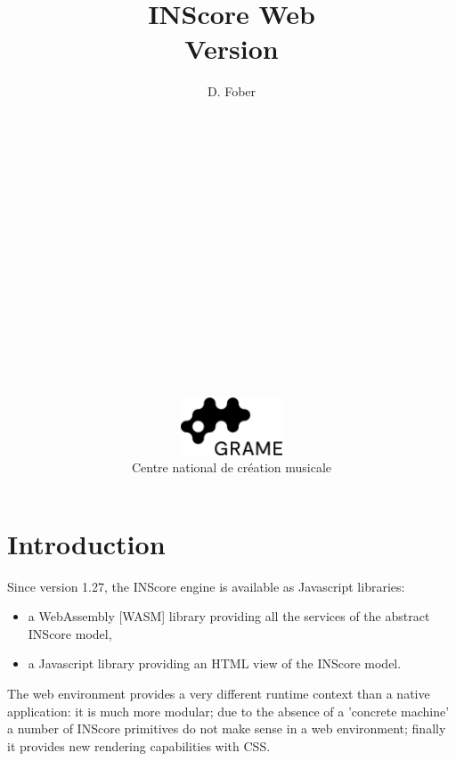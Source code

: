 \documentclass[a4paper,twoside]{article}
\newcommand{\toplevel}[1]	{\section{#1}}
\begin{document}
\title{\vspace*{8cm}INScore Web \\ {\large Version \inscoreversion}}
\author{D. Fober\\ 
\\
\\
\\
\\
\\
\\
\\
\\
\\
\\
\\
\\
\\
\\
\\
\\
\\
\includegraphics[width=30mm]{../imgs/Logo_Grame}\\
Centre national de création musicale\\
}
\date{}


\maketitle
\thispagestyle{empty}
 
\cleardoublepage
\tableofcontents
\newpage
\setcounter{page}{1}
\pagestyle{plain}


\toplevel{Introduction}
\label{introduction}

Since version 1.27, the INScore engine is available as Javascript libraries:
\begin{itemize}
\item a WebAssembly [WASM] library providing all the services of the abstract INScore model,
\item a Javascript library providing an HTML view of the INScore model.
\end{itemize}

The web environment provides a very different runtime context than a native application: 
it is much more modular; due to the absence of a 'concrete machine' a number of INScore primitives do not make sense in a web environment; finally it provides new rendering capabilities with CSS. 
\end{document}
